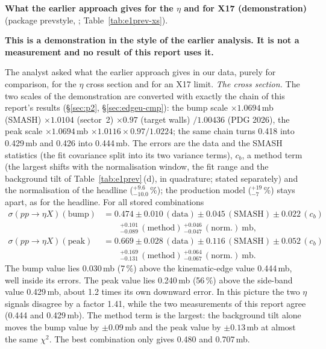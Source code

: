 \documentclass[11pt,a4paper]{article}
\newcommand{\code}[1]{\texttt{\detokenize{#1}}}
\newcommand{\sigeta}{\ensuremath{\sigma(pp\to\eta X)}\xspace}
\newcommand{\notebox}[1]{\par\noindent\colorbox{orange!10}{\parbox{\dimexpr\linewidth-2\fboxsep\relax}{#1}}\par}
\begin{document}
\textbf{What the earlier approach gives for the $\eta$ and for X17 (demonstration)} (package prevstyle, \code{prevstyle_results_xs.py};
Table~\ref{tab:e1prev-xs}).
\notebox{\textbf{This is a demonstration in the style of the earlier analysis. It is not a measurement and no result of this report uses it.}}
The analyst asked what the earlier approach gives in our data, purely for comparison, for the $\eta$ cross section and for an X17 limit.
\emph{The cross section.} The two scales of the demonstration are converted with exactly the chain of this report's results
(\S\ref{sec:p2}, \S\ref{sec:edgeu-cmp}): the bump scale $\times1.0694$\,mb (SMASH) $\times1.0104$ (sector~2) $\times0.97$ (target walls)
$/1.00436$ (PDG 2026), the peak scale $\times1.0694$\,mb $\times1.0116\times0.97/1.0224$; the same chain turns 0.418 into 0.429\,mb and 0.426
into 0.444\,mb. The errors are the data and the SMASH statistics (the fit covariance split into its two variance terms), $c_b$, a method term
(the largest shifts with the normalisation window, the fit range and the background tilt of Table~\ref{tab:e1prev}\,(d), in quadrature; stated
separately) and the normalisation of the headline ($^{+9.6}_{-10.0}$\,\%); the production model ($^{+19}_{-7}$\,\%) stays apart, as for the
headline. For all stored combinations
\begin{align*}
\sigeta(\text{bump})&=0.474\pm0.010\,(\text{data})\pm0.045\,(\text{SMASH})\pm0.022\,(c_b)\\
&\qquad{}^{+0.101}_{-0.089}\,(\text{method})\,^{+0.046}_{-0.047}\,(\text{norm.})\ \text{mb},\\
\sigeta(\text{peak})&=0.669\pm0.028\,(\text{data})\pm0.116\,(\text{SMASH})\pm0.052\,(c_b)\\
&\qquad{}^{+0.169}_{-0.131}\,(\text{method})\,^{+0.064}_{-0.067}\,(\text{norm.})\ \text{mb}.
\end{align*}
The bump value lies 0.030\,mb (7\,\%) above the kinematic-edge value 0.444\,mb, well inside its errors. The peak value lies 0.240\,mb (56\,\%)
above the side-band value 0.429\,mb, about 1.2 times its own downward error. In this picture the two $\eta$ signals disagree by a factor 1.41,
while the two measurements of this report agree (0.444 and 0.429\,mb). The method term is the largest: the background tilt alone moves the
bump value by $\pm0.09$\,mb and the peak value by $\pm0.13$\,mb at almost the same $\chi^2$. The best combination only gives 0.480 and
0.707\,mb.
\end{document}
